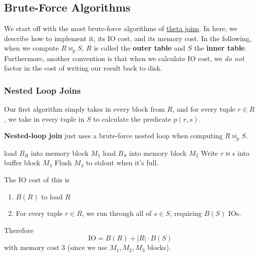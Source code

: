 \subsection{Brute-Force Algorithms}  

  We start off with the most brute-force algorithms of \hyperref[def:theta-join-2]{theta joins}. In here, we describe how to implement it, its IO cost, and its memory cost. In the following, when we compute $R \bowtie_p S$, $R$ is called the \textbf{outer table} and $S$ the \textbf{inner table}. Furthermore, another convention is that when we calculate IO cost, we \textit{do not} factor in the cost of writing our result back to disk.  

  \subsubsection{Nested Loop Joins} 

    Our first algorithm simply takes in every block from $R$, and for every tuple $r \in R$, we take in every tuple in $S$ to calculate the predicate $p(r, s)$. 

    \begin{algo}
      \textbf{Nested-loop join} just uses a brute-force nested loop when computing $R \bowtie_p S$. 
      \begin{algorithm}[H]
        \caption{Nested loop Join}
        \begin{algorithmic}
              \State load $B_R$ into memory block $M_1$
                  \State load $B_S$ into memory block $M_2$
                      \State Write $r \bowtie s$ into buffer block $M_3$ 
                      \State Flush $M_3$ to stdout when it's full. 
                    \EndIf
                  \EndFor
                \EndFor
              \EndFor
            \EndFor
          \EndFunction
        \end{algorithmic}
      \end{algorithm} 
      The IO cost of this is 
      \begin{enumerate}
        \item $B(R)$ to load $R$ 
        \item For every tuple $r \in R$, we run through all of $s \in S$, requiring $B(S)$ IOs.
      \end{enumerate} 
      Therefore
      \begin{equation}
        \mathrm{IO} = B(R) + |R| \cdot B(S)
      \end{equation}
      with memory cost $3$ (since we use $M_1, M_2, M_3$ blocks).
    \end{algo}

